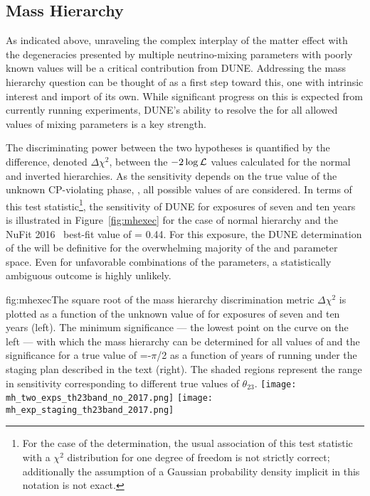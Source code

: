 \subsection{Mass Hierarchy}
\label{sec:exec-summ-physics-mh-cpv}

As indicated above, unraveling the complex interplay of the matter effect with the degeneracies presented by multiple neutrino-mixing parameters with poorly known values will be a critical contribution from DUNE. Addressing the mass hierarchy question can be thought of as a first step toward this, one with intrinsic interest and import of its own.  While significant progress on this is expected from currently running experiments, DUNE's ability to resolve the  for all allowed values of mixing parameters is a key strength.

The discriminating power between the two  hypotheses is quantified
by the difference, denoted $\Delta \chi^2$, between the
$-2\log{\cal L}$ values calculated for the normal and inverted
hierarchies. As the sensitivity depends on the true value of the unknown
CP-violating phase, \deltacp, all possible values of \deltacp are
considered.  In terms of this test statistic\footnote{For the case of the  determination, the usual
  association of this test statistic with a $\chi^2$ distribution for
  one degree of freedom is not strictly correct; additionally the assumption of a
  Gaussian probability density 
  implicit in this notation is not exact.}, the 
sensitivity of DUNE for exposures of seven and ten years is
illustrated in Figure~\ref{fig:mhexec} for the case of normal
hierarchy and the NuFit 2016~\cite{Esteban:2016qun} best-fit value of  = 0.44. 
For this exposure, the DUNE determination of the  will be definitive for
the overwhelming majority of the  \deltacp and  parameter space.
Even for unfavorable combinations of the parameters, a statistically
ambiguous outcome is highly unlikely.  
\begin{dunefigure}{fig:mhexec}{The
    square root of the mass hierarchy discrimination metric $\Delta
    \chi^2$ is plotted as a function of the unknown value of \deltacp
    for exposures of seven and ten years  
    (left).  The minimum significance
    --- the lowest point on the curve on the left --- with which the mass
    hierarchy can be determined for all values of \deltacp and the significance for a true value of \deltacp=-$\pi$/2 as a
    function of years of running under the staging plan described in the text (right).
    The shaded regions represent the range in sensitivity corresponding to
    different true values of $\theta_{23}$.}
\texttt{[image: mh\_two\_exps\_th23band\_no\_2017.png]}
\texttt{[image: mh\_exp\_staging\_th23band\_2017.png]}
\end{dunefigure}


